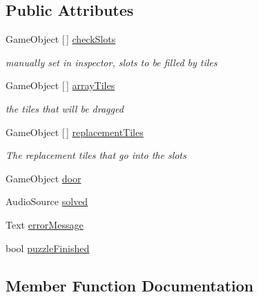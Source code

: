 \subsection*{Public Attributes}
\begin{DoxyCompactItemize}
\item 
Game\+Object \mbox{[}$\,$\mbox{]} \hyperlink{class_arith_completion_check_a29d52d8c29770841ace7a35f5b47f8c7}{check\+Slots}
\begin{DoxyCompactList}\small\item\em manually set in inspector, slots to be filled by tiles \end{DoxyCompactList}\item 
Game\+Object \mbox{[}$\,$\mbox{]} \hyperlink{class_arith_completion_check_a6dd56d93f27bc485fc9354f665a87c2e}{array\+Tiles}
\begin{DoxyCompactList}\small\item\em the tiles that will be dragged \end{DoxyCompactList}\item 
Game\+Object \mbox{[}$\,$\mbox{]} \hyperlink{class_arith_completion_check_a3e4dcde9c1f9660ba26ed864b0a465ac}{replacement\+Tiles}
\begin{DoxyCompactList}\small\item\em The replacement tiles that go into the slots \end{DoxyCompactList}\item 
Game\+Object \hyperlink{class_arith_completion_check_a1ad4ba57922024cef5fc6e788a021f52}{door}
\item 
Audio\+Source \hyperlink{class_arith_completion_check_a3621baade2321e11481457c53e853595}{solved}
\item 
Text \hyperlink{class_arith_completion_check_a715d43af8f5e7b253e9f2da337733d4b}{error\+Message}
\item 
bool \hyperlink{class_arith_completion_check_a11562602e8ce1c9434e869aadf0ac697}{puzzle\+Finished}
\end{DoxyCompactItemize}


\subsection{Member Function Documentation}
\mbox{\label{class_arith_completion_check_ae813642087af9661c17a03f8545d6f34}} 
